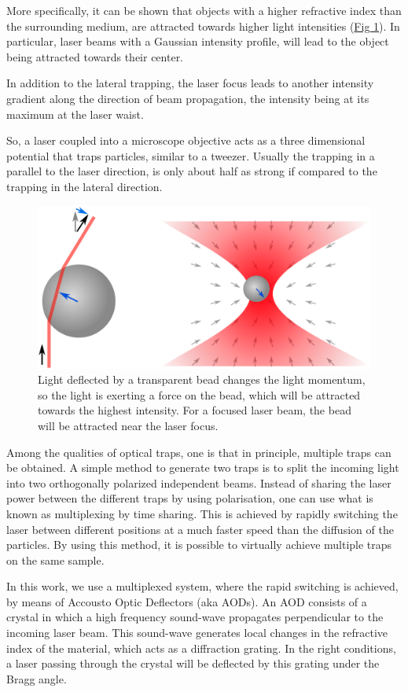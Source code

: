 \documentclass[A4paperpaper,11pt,english]{sphinxmanual}
\begin{document}
More specifically, it can be shown that objects with a higher refractive
index than the surrounding medium, are attracted towards higher light intensities
(\hyperref[index-latex:setup]{Fig  \ref*{index-latex:setup}}).  In particular, laser beams with a Gaussian intensity
profile, will lead to the object being attracted towards their center.

In addition to the lateral trapping, the laser focus leads to
another intensity gradient along the direction of beam propagation, the intensity being at its maximum at the laser waist.

So, a laser coupled into a microscope objective acts as a three dimensional
potential that traps particles, similar to a tweezer. Usually the trapping in
a parallel to the laser direction, is only about half as strong if compared to the trapping in the
lateral direction.
\begin{figure}[htbp]
\centering
\capstart

\includegraphics[width=0.700\linewidth]{ot1.png}
\caption{Light deflected by a transparent bead changes the light momentum, so the
light is exerting a force on the bead, which will be attracted towards
the highest intensity.  For a focused laser beam, the bead will be attracted
near the laser focus.}\label{index-latex:setup}\end{figure}

Among the qualities of optical traps, one is that in principle, multiple traps can be
obtained. A simple method to generate two traps is to split the incoming light
into two orthogonally polarized independent beams.  Instead of sharing the
laser power between the different traps by using polarisation, one can use what
is known as multiplexing by time sharing. This is achieved by rapidly switching the laser
between different positions at a much faster speed than the diffusion of the particles. By using this method,
it is possible to virtually achieve multiple traps on the same
sample.

In this work, we use a multiplexed system, where the rapid switching is achieved, by means of Accousto Optic Deflectors
(aka AODs).  An AOD consists of a crystal in which a high frequency
sound-wave propagates perpendicular to the incoming laser beam. This sound-wave generates local changes in the
refractive index of the material, which acts as a diffraction grating. In
the right conditions, a laser passing through the crystal will
be deflected by this grating under the Bragg angle.
\end{document}
